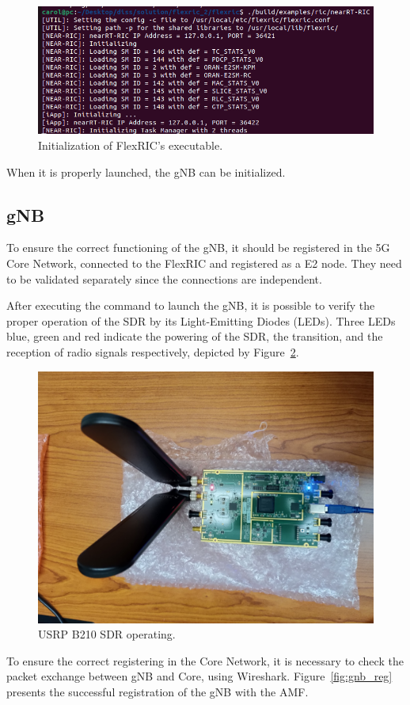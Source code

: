 \begin{figure}[H]
    \centering
    \includegraphics[width=0.5\linewidth]{figures/flexric_init}
    \caption{Initialization of FlexRIC's executable.}
    \label{fig:near-rt-ric}
\end{figure}

When it is properly launched, the gNB can be initialized.

\subsection{gNB}\label{subsec:gnb}
To ensure the correct functioning of the gNB, it should be registered in the 5G Core Network, connected to the FlexRIC and registered as a E2 node.
They need to be validated separately since the connections are independent.

After executing the command to launch the gNB\@, it is possible to verify the proper operation of the SDR by its Light-Emitting Diodes (LEDs).
Three LEDs blue, green and red indicate the powering of the SDR, the transition, and the reception of radio signals respectively, depicted by Figure~\ref{fig:usrp_working}.

\begin{figure}[H]
    \centering
    \includegraphics[width=0.5\linewidth]{figures/usrp_working}
    \caption[USRP B210 SDR operating]{USRP B210 SDR operating.}
    \label{fig:usrp_working}
\end{figure}

To ensure the correct registering in the Core Network, it is necessary to check the packet exchange between gNB and Core, using Wireshark.
Figure~\ref{fig:gnb_reg} presents the successful registration of the gNB with the AMF\@.

